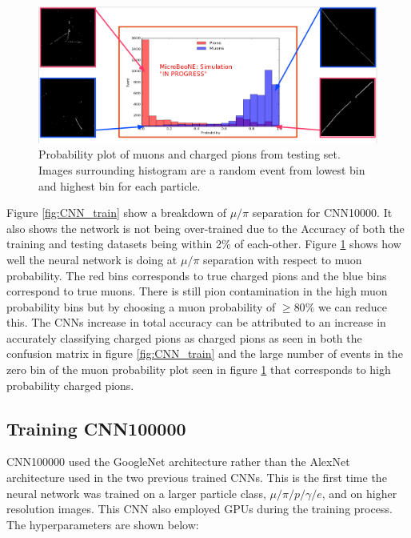 \begin{figure}[htp!]
\includegraphics[width=\textwidth]{figs/mitch_hw.png}
\caption{Probability plot of muons and charged pions from testing set. Images surrounding histogram are a random event from lowest bin and highest bin for each particle.}
\label{fig:prob_plot}
\end{figure}

Figure \ref{fig:CNN_train} show a breakdown of $\mu/\pi$ separation for CNN10000. It also shows the network is not being over-trained due to the Accuracy of both the training and testing datasets being within 2\% of each-other. Figure \ref{fig:prob_plot} shows how well the neural network is doing at $\mu/\pi$ separation with respect to muon probability. The red bins corresponds to true charged pions and the blue bins correspond to true muons. There is still pion contamination in the high muon probability bins but by choosing a muon probability of $\geq 80\%$ we can reduce this. The CNNs increase in total accuracy can be attributed to an increase in accurately classifying charged pions as charged pions as seen in both the confusion matrix in figure \ref{fig:CNN_train} and the large number of events in the zero bin of the muon probability plot seen in figure \ref{fig:prob_plot} that corresponds to high probability charged pions.   



\subsection{Training CNN100000}
CNN100000 used the GoogleNet architecture rather than the AlexNet architecture used in the two previous trained CNNs. This is the first time the neural network was trained on a larger particle class, $\mu/\pi/p/\gamma/e$, and on higher resolution images. This CNN also employed GPUs during the training process. The hyperparameters are shown below:

